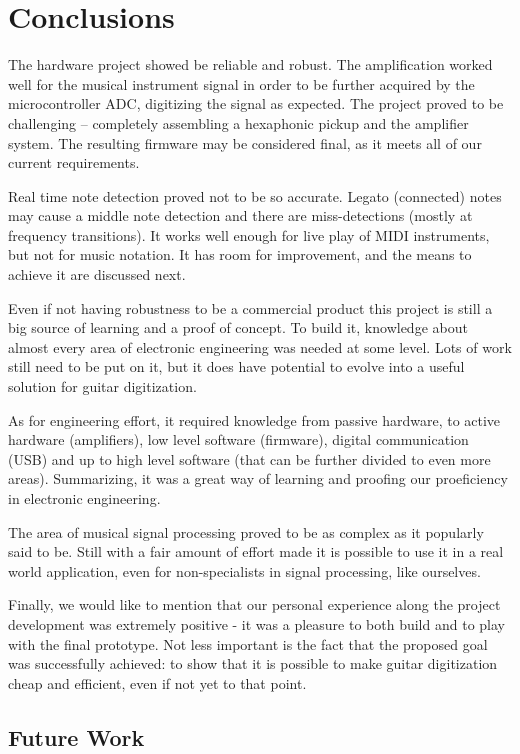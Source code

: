 \chapter[Conclusion]{Conclusions}

The hardware project showed be reliable and robust. The amplification worked
well for the musical instrument signal in order to be further acquired by the
microcontroller ADC, digitizing the signal as expected.
The project proved to be challenging -- completely assembling a
hexaphonic pickup and the amplifier system.
The resulting firmware may be considered final, as it meets all of our
current requirements.

Real time note detection proved not to be so accurate. Legato (connected) notes
may cause a middle note detection and there are miss-detections (mostly at frequency
transitions). It works well enough for live play of MIDI instruments, but not
for music notation. It has room for improvement, and the means to achieve
it are discussed next.

Even if not having robustness to be a commercial product this project is still a big source
of learning and a proof of concept. To build it, knowledge about almost every area
of electronic engineering was needed at some level. Lots of work still need to be put on it,
but it does have potential to evolve into a useful solution for guitar digitization.

As for engineering effort, it required knowledge from passive hardware, to active hardware
(amplifiers), low level software (firmware), digital communication (USB) and up to high
level software (that can be further divided to even more areas). Summarizing, it was
a great way of learning and proofing our proeficiency in electronic engineering.

The area of musical signal processing proved to be as complex as it popularly said to be.
Still with a fair amount of effort made it is possible to use it in a real world application,
even for non-specialists in signal processing, like ourselves.

Finally, we would like to mention that our personal experience along the project development was
extremely positive - it was a pleasure to both build and to play with the final prototype. Not
less important is the fact that the proposed goal was successfully achieved: to show that it
is possible to make guitar digitization cheap and efficient, even if not yet to that point.

\section{Future Work}

